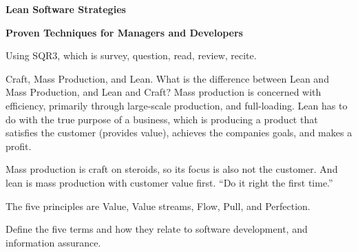 




\twelvepoint

\centerline{\bf Lean Software Strategies}
\smallskip
\centerline{\bf Proven Techniques for Managers and Developers}
\bigskip
Using SQR3, which is survey, question, read, review, recite.
\bigskip



 Craft, Mass Production, and Lean.
 What is the difference between Lean and Mass Production, and Lean and Craft?
Mass production is concerned with efficiency, primarily through large-scale production, and full-loading.
Lean has to do with the true purpose of a business, which is producing a product that satisfies the customer (provides
value), achieves the companies goals, and makes a profit.

Mass production is craft on steroids, so its focus is also not the customer.
And lean is mass production with customer value first. ``Do it right the first time.''


 The five principles are Value, Value streams, Flow, Pull, and Perfection.

 Define the five terms and how they relate to software development, and information assurance.

\bye
